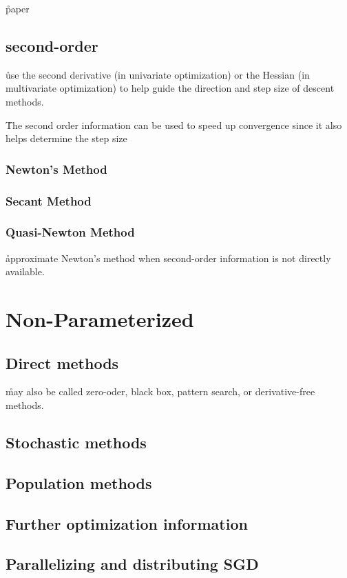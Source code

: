 \r{paper\cite{reddi2019convergence}}


\subsection{second-order}

\r{use the second derivative (in univariate optimization) or the Hessian (in multivariate optimization) to help guide the direction and step size of descent methods.}

\r{The second order information can be used to speed up convergence since it also helps determine the step size}

\subsubsection{Newton's Method}

\subsubsection{Secant Method}

\subsubsection{Quasi-Newton Method}

\r{approximate Newton's method when second-order information is not directly available.}

\section{Non-Parameterized}

\subsection{Direct methods}

\r{may also be called zero-oder, black box, pattern search, or derivative-free methods.}

\subsection{Stochastic methods}

\subsection{Population methods}

\subsection{Further optimization information}


\subsection{Parallelizing and distributing SGD}


